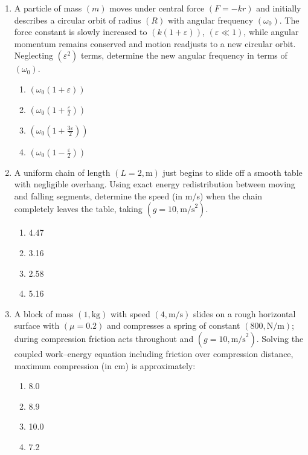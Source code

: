 \documentclass[12pt]{article}
\begin{document}
\begin{enumerate}
\item A particle of mass $(m)$ moves under central force $(F=-kr)$ and initially describes a circular orbit of radius $(R)$ with angular frequency $(\omega_0)$. The force constant is slowly increased to $(k(1+\varepsilon))$, $(\varepsilon\ll1)$, while angular momentum remains conserved and motion readjusts to a new circular orbit. Neglecting $(\varepsilon^2)$ terms, determine the new angular frequency in terms of $(\omega_0)$.

\begin{enumerate}[label=\Alph*)]
\item $\left(\omega_0\left(1+\varepsilon\right)\right)$
\item $\left(\omega_0\left(1+\frac{\varepsilon}{2}\right)\right)$
\item $\left(\omega_0\left(1+\frac{3\varepsilon}{2}\right)\right)$
\item $\left(\omega_0\left(1-\frac{\varepsilon}{2}\right)\right)$
\end{enumerate}

\item A uniform chain of length $(L=2,\text{m})$ just begins to slide off a smooth table with negligible overhang. Using exact energy redistribution between moving and falling segments, determine the speed (in m/s) when the chain completely leaves the table, taking $(g=10,\text{m/s}^2)$.

\begin{enumerate}[label=\Alph*)]
\item 4.47
\item 3.16
\item 2.58
\item 5.16
\end{enumerate}

\item A block of mass $(1,\text{kg})$ with speed $(4,\text{m/s})$ slides on a rough horizontal surface with $(\mu=0.2)$ and compresses a spring of constant $(800,\text{N/m})$; during compression friction acts throughout and $(g=10,\text{m/s}^2)$. Solving the coupled work--energy equation including friction over compression distance, maximum compression (in cm) is approximately:

\begin{enumerate}[label=\Alph*)]
\item 8.0
\item 8.9
\item 10.0
\item 7.2
\end{enumerate}


\end{enumerate}
\end{document}
